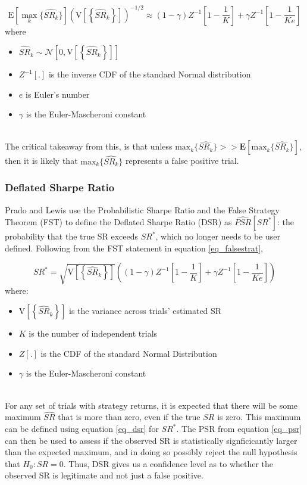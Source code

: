 \documentclass[a4paper,11pt,oneside]{article}
\theoremstyle{plain}
\theoremstyle{definition}
\begin{document}
	\begin{equation}\label{eq_falsestrat}
		\mathrm{E}\left[{\max_k}\{\widehat{SR_k}\}\right]\left(\mathrm{V}\left[\left\{\widehat{S R}_{k}\right\}\right]\right)^{-1 / 2}\approx(1-\gamma) Z^{-1}\left[1-\frac{1}{K}\right]+\gamma Z^{-1}\left[1-\frac{1}{K e}\right]	
	\end{equation}
		where
	\begin{itemize}
		\item [] $\widehat{S R}_{k} \sim \mathcal{N}\left[0, \mathrm{V}\left[\left\{\widehat{S R}_{k}\right\}\right]\right]$
		\item [] $Z^{-1}[.]$ is the inverse CDF of the standard Normal distribution
		\item [] $e$ is Euler's number
		\item [] $\gamma$ is the Euler-Mascheroni constant
	\end{itemize}
	~\\
	The critical takeaway from this, is that unless $\mathrm{max}_k\{\widehat{SR_k}\} >> \mathbf{E}\left[\mathrm{max}_k\{\widehat{SR_k}\}\right]$, then it is likely that $\mathrm{max}_k\{\widehat{SR_k}\}$ represents a false positive trial.
		
		
	
	\subsubsection{Deflated Sharpe Ratio}
	
	Prado and Lewis use the Probabilistic Sharpe Ratio and the False Strategy Theorem (FST) to define the Deflated Sharpe Ratio (DSR) as $\widehat{PSR}[SR^*]$: the probability that the true SR exceeds $SR^*$, which no longer needs to be user defined. Following from the FST statement in equation \ref{eq_falsestrat}, 
	
	\begin{equation}\label{eq_dsr}
	SR^{*}=\sqrt{\mathrm{V}\left[\left\{\widehat{S R}_{k}\right\}\right]}\left((1-\gamma) Z^{-1}\left[1-\frac{1}{K}\right]+\gamma Z^{-1}\left[1-\frac{1}{K e}\right]\right)
	\end{equation}
	where:
	\begin{itemize}
		\item [] $\mathrm{V}\left[\left\{\widehat{S R}_{k}\right\}\right]$ is the variance across trials' estimated SR
		\item [] $K$ is the number of independent trials
		\item [] $Z[.]$ is the CDF of the standard Normal Distribution 
		\item [] $\gamma$ is the Euler-Mascheroni constant
	\end{itemize}
	~\\
	For any set of trials with strategy returns, it is expected that there will be some maximum $\widehat{SR}$ that is more than zero, even if the true $SR$ is zero. This maximum can be defined using equation \ref{eq_dsr} for $SR^*$. The PSR from equation \ref{eq_psr} can then be used to assess if the observed SR is statistically signficicantly larger than the expected maximum, and in doing so possibly reject the null hypothesis that $H_0: SR = 0$. Thus, DSR gives us a confidence level as to whether the observed SR is legitimate and not just a false positive.
	
\end{document}

